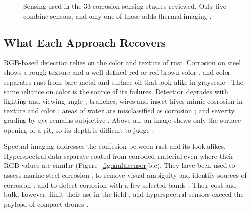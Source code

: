 \begin{figure}[htbp]
\centering
{}
\caption[Sensing used in the reviewed corrosion studies]{Sensing used in the 33 corrosion-sensing studies reviewed. Only five
combine sensors, and only one of those adds thermal imaging \citep{Lim2021}.}
\label{fig:corr-sensing}
\end{figure}

\subsection{What Each Approach Recovers}

RGB-based detection relies on the color and texture of rust. Corrosion on steel
shows a rough texture and a well-defined red or red-brown color \citep{Rahman2021,HerndonTien2025}, and
color separates rust from bare metal and surface oil that look alike in
grayscale \citep{Hu2023}. The same reliance on color is the source of its failures.
Detection degrades with lighting and viewing angle \citep{Hu2023,Yu2023,HerndonTien2025}; branches,
wires and insect hives mimic corrosion in texture and color \citep{HerndonTien2025}; areas of
water are misclassified as corrosion \citep{Rahman2021}; and severity grading by eye remains
subjective \citep{Li2024b}. Above all, an image shows only the surface opening of a pit,
so its depth is difficult to judge \citep{Suzuki2026}.

Spectral imaging addresses the confusion between rust and its look-alikes.
Hyperspectral data separate coated from corroded material even where their RGB
values are similar \citep{PallasEnguita2025} (Figure~\ref{fig:multisensor}b,c). They have been used to assess marine steel
corrosion \citep{Arias2025}, to remove visual ambiguity and identify sources of corrosion
\citep{Lavadiya2022}, and to detect corrosion with a few selected bands \citep{Hernndez-Surez2026}. Their cost and bulk, however, limit
their use in the field \citep{Tang2025}, and hyperspectral sensors exceed the payload of
compact drones \citep{PallasEnguita2025}.

